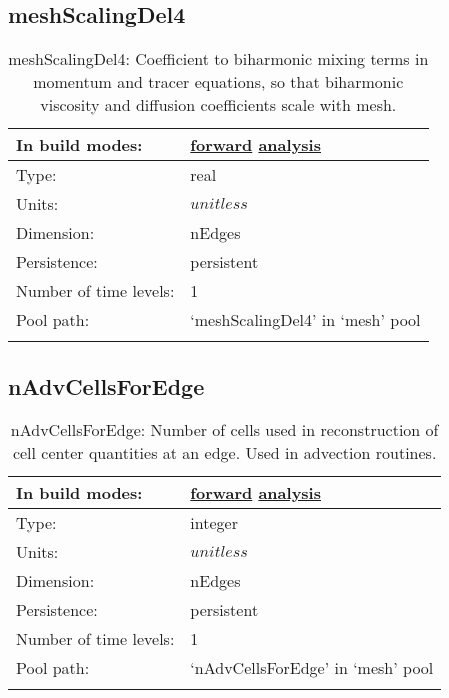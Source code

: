 \subsection[meshScalingDel4]{meshScalingDel4}
\label{subsec:var_sec_mesh_meshScalingDel4}
\begin{center}
\begin{longtable}{| p{2.0in} | p{4.0in} |}
        \hline 
        In build modes: & \hyperref[subsec:forward_var_tab_mesh]{forward} \hyperref[subsec:analysis_var_tab_mesh]{analysis} \\
        \hline 
        Type: & real \\
        \hline 
        Units: & $unitless$ \\
        \hline 
        Dimension: & nEdges \\
        \hline 
        Persistence: & persistent \\
        \hline 
        Number of time levels: & 1 \\
        \hline 
            Pool path: & `meshScalingDel4' in `mesh' pool \\
		 \hline 
    \caption{meshScalingDel4: Coefficient to biharmonic mixing terms in momentum and tracer equations, so that biharmonic viscosity and diffusion coefficients scale with mesh.}
\end{longtable}
\end{center}
\subsection[nAdvCellsForEdge]{nAdvCellsForEdge}
\label{subsec:var_sec_mesh_nAdvCellsForEdge}
\begin{center}
\begin{longtable}{| p{2.0in} | p{4.0in} |}
        \hline 
        In build modes: & \hyperref[subsec:forward_var_tab_mesh]{forward} \hyperref[subsec:analysis_var_tab_mesh]{analysis} \\
        \hline 
        Type: & integer \\
        \hline 
        Units: & $unitless$ \\
        \hline 
        Dimension: & nEdges \\
        \hline 
        Persistence: & persistent \\
        \hline 
        Number of time levels: & 1 \\
        \hline 
            Pool path: & `nAdvCellsForEdge' in `mesh' pool \\
		 \hline 
    \caption{nAdvCellsForEdge: Number of cells used in reconstruction of cell center quantities at an edge. Used in advection routines.}
\end{longtable}
\end{center}
